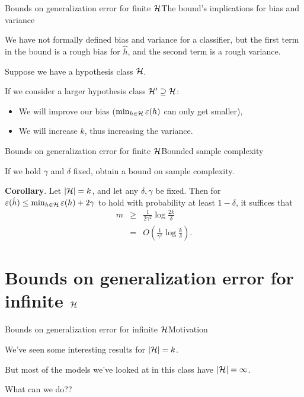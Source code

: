 \documentclass{beamer}
\begin{document}
\begin{frame}{Bounds on generalization error for finite $\cal H$}{The bound's implications for bias and variance}

  We have not formally defined bias and variance for a classifier, but
  the first term in the bound is a rough bias for $\hat{h}$, and the
  second term is a rough variance.

  \medskip
  
  Suppose we have a hypothesis class $\cal H$.

  \medskip

  If we consider a larger hypothesis class
  ${\cal H}' \supseteq \cal H$:
  \begin{itemize}
    \item We will improve our bias
      ($\min_{h \in \cal H}\varepsilon(h)$ can only get smaller),
    \item We will increase $k$, thus increasing the variance.
  \end{itemize}
  
\end{frame}


\begin{frame}{Bounds on generalization error for finite $\cal H$}{Bounded sample complexity}

  If we hold $\gamma$ and $\delta$ fixed, obtain a bound on sample
  complexity.

  \medskip
  
  \textbf{Corollary}. Let $|{\cal H}| = k$, and let any
  $\delta,\gamma$ be fixed. Then for $\varepsilon(\hat{h}) \le \min_{h
    \in \cal H} \varepsilon(h) + 2 \gamma$ to hold with probability
  at least $1-\delta$, it suffices that
  \begin{eqnarray*}
    m & \ge & \frac{1}{2\gamma^2}\log\frac{2k}{\delta} \\
    & = & O\left(\frac{1}{\gamma^2}\log\frac{k}{\delta}\right) .
  \end{eqnarray*}
  
\end{frame}

\section{Bounds on generalization error for infinite $\cal H$}

\begin{frame}{Bounds on generalization error for infinite $\cal H$}{Motivation}

  We've seen some interesting results for $|{\cal H}| = k$.

  \medskip

  But most of the models we've looked at in this class have
  $|{\cal H}| = \infty$.

  \medskip

  What can we do??

\end{frame}
\end{document}
